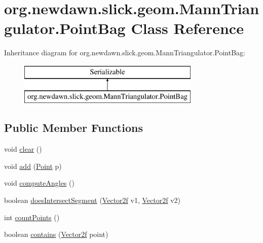 \hypertarget{classorg_1_1newdawn_1_1slick_1_1geom_1_1_mann_triangulator_1_1_point_bag}{}\section{org.\+newdawn.\+slick.\+geom.\+Mann\+Triangulator.\+Point\+Bag Class Reference}
\label{classorg_1_1newdawn_1_1slick_1_1geom_1_1_mann_triangulator_1_1_point_bag}
Inheritance diagram for org.\+newdawn.\+slick.\+geom.\+Mann\+Triangulator.\+Point\+Bag\+:\begin{figure}[H]
\begin{center}
\leavevmode
\includegraphics[height=2.000000cm]{classorg_1_1newdawn_1_1slick_1_1geom_1_1_mann_triangulator_1_1_point_bag}
\end{center}
\end{figure}
\subsection*{Public Member Functions}
\begin{DoxyCompactItemize}
\item 
void \mbox{\hyperlink{classorg_1_1newdawn_1_1slick_1_1geom_1_1_mann_triangulator_1_1_point_bag_a5c4e5b96ea8667ed723478412b412d3c}{clear}} ()
\item 
void \mbox{\hyperlink{classorg_1_1newdawn_1_1slick_1_1geom_1_1_mann_triangulator_1_1_point_bag_a7af185327fa10df11a02cf2f1fe6dcd4}{add}} (\mbox{\hyperlink{classorg_1_1newdawn_1_1slick_1_1geom_1_1_mann_triangulator_1_1_point}{Point}} p)
\item 
void \mbox{\hyperlink{classorg_1_1newdawn_1_1slick_1_1geom_1_1_mann_triangulator_1_1_point_bag_a718c1b78b0745ea72f661d00882250a3}{compute\+Angles}} ()
\item 
boolean \mbox{\hyperlink{classorg_1_1newdawn_1_1slick_1_1geom_1_1_mann_triangulator_1_1_point_bag_a8db4f4ea9b3ed93c73fa322fe1f28ebc}{does\+Intersect\+Segment}} (\mbox{\hyperlink{classorg_1_1newdawn_1_1slick_1_1geom_1_1_vector2f}{Vector2f}} v1, \mbox{\hyperlink{classorg_1_1newdawn_1_1slick_1_1geom_1_1_vector2f}{Vector2f}} v2)
\item 
int \mbox{\hyperlink{classorg_1_1newdawn_1_1slick_1_1geom_1_1_mann_triangulator_1_1_point_bag_ab40da343a7df21c7fa966a70890ae985}{count\+Points}} ()
\item 
boolean \mbox{\hyperlink{classorg_1_1newdawn_1_1slick_1_1geom_1_1_mann_triangulator_1_1_point_bag_aa6ec224f791da0d76127b41cd216b977}{contains}} (\mbox{\hyperlink{classorg_1_1newdawn_1_1slick_1_1geom_1_1_vector2f}{Vector2f}} point)
\end{DoxyCompactItemize}
